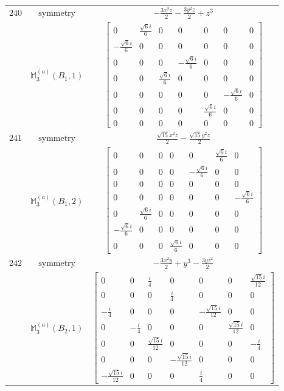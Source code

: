 \documentclass[fleqn,8pt,landscape]{jsarticle}
\begin{document}
\begin{longtable}{ccc}
$ 240 $ & $ \text{symmetry} $ & $ - \frac{3 x^{2} z}{2} - \frac{3 y^{2} z}{2} + z^{3} $ \\
$  $ & $ \mathbb{M}_{3}^{(a)}(B_{1},1) $ & $ \begin{bmatrix} 0 & \frac{\sqrt{6} i}{6} & 0 & 0 & 0 & 0 & 0 \\ - \frac{\sqrt{6} i}{6} & 0 & 0 & 0 & 0 & 0 & 0 \\ 0 & 0 & 0 & - \frac{\sqrt{6} i}{6} & 0 & 0 & 0 \\ 0 & 0 & \frac{\sqrt{6} i}{6} & 0 & 0 & 0 & 0 \\ 0 & 0 & 0 & 0 & 0 & - \frac{\sqrt{6} i}{6} & 0 \\ 0 & 0 & 0 & 0 & \frac{\sqrt{6} i}{6} & 0 & 0 \\ 0 & 0 & 0 & 0 & 0 & 0 & 0 \end{bmatrix} $ \\ \hline
$ 241 $ & $ \text{symmetry} $ & $ \frac{\sqrt{15} x^{2} z}{2} - \frac{\sqrt{15} y^{2} z}{2} $ \\
$  $ & $ \mathbb{M}_{3}^{(a)}(B_{1},2) $ & $ \begin{bmatrix} 0 & 0 & 0 & 0 & 0 & \frac{\sqrt{6} i}{6} & 0 \\ 0 & 0 & 0 & 0 & - \frac{\sqrt{6} i}{6} & 0 & 0 \\ 0 & 0 & 0 & 0 & 0 & 0 & 0 \\ 0 & 0 & 0 & 0 & 0 & 0 & - \frac{\sqrt{6} i}{6} \\ 0 & \frac{\sqrt{6} i}{6} & 0 & 0 & 0 & 0 & 0 \\ - \frac{\sqrt{6} i}{6} & 0 & 0 & 0 & 0 & 0 & 0 \\ 0 & 0 & 0 & \frac{\sqrt{6} i}{6} & 0 & 0 & 0 \end{bmatrix} $ \\ \hline
$ 242 $ & $ \text{symmetry} $ & $ - \frac{3 x^{2} y}{2} + y^{3} - \frac{3 y z^{2}}{2} $ \\
$  $ & $ \mathbb{M}_{3}^{(a)}(B_{2},1) $ & $ \begin{bmatrix} 0 & 0 & \frac{i}{4} & 0 & 0 & 0 & \frac{\sqrt{15} i}{12} \\ 0 & 0 & 0 & \frac{i}{4} & 0 & 0 & 0 \\ - \frac{i}{4} & 0 & 0 & 0 & - \frac{\sqrt{15} i}{12} & 0 & 0 \\ 0 & - \frac{i}{4} & 0 & 0 & 0 & \frac{\sqrt{15} i}{12} & 0 \\ 0 & 0 & \frac{\sqrt{15} i}{12} & 0 & 0 & 0 & - \frac{i}{4} \\ 0 & 0 & 0 & - \frac{\sqrt{15} i}{12} & 0 & 0 & 0 \\ - \frac{\sqrt{15} i}{12} & 0 & 0 & 0 & \frac{i}{4} & 0 & 0 \end{bmatrix} $ \\ \hline

\end{longtable}
\end{document}
